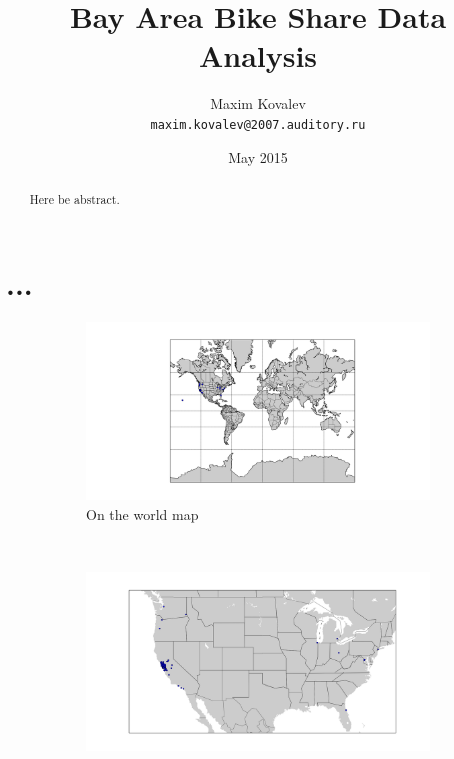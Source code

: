 \documentclass{article}
\title{Bay Area Bike Share Data Analysis}
\author{Maxim Kovalev\\\texttt{maxim.kovalev@2007.auditory.ru}}
\date{May 2015}
\begin{document}
\maketitle

\begin{abstract}
Here be abstract.
\end{abstract}

\section{...}



\begin{figure}
        \centering
        \begin{subfigure}[b]{0.5\textwidth}
                \includegraphics[width=\textwidth]{../home_zips_world.png}
                \caption{On the world map}
                \label{fig:homezips:world}
        \end{subfigure}%
        ~ %
        \begin{subfigure}[b]{0.5\textwidth}
                \includegraphics[width=\textwidth]{../home_zips_usa.png}

\end{subfigure}
\end{figure}
\end{document}
